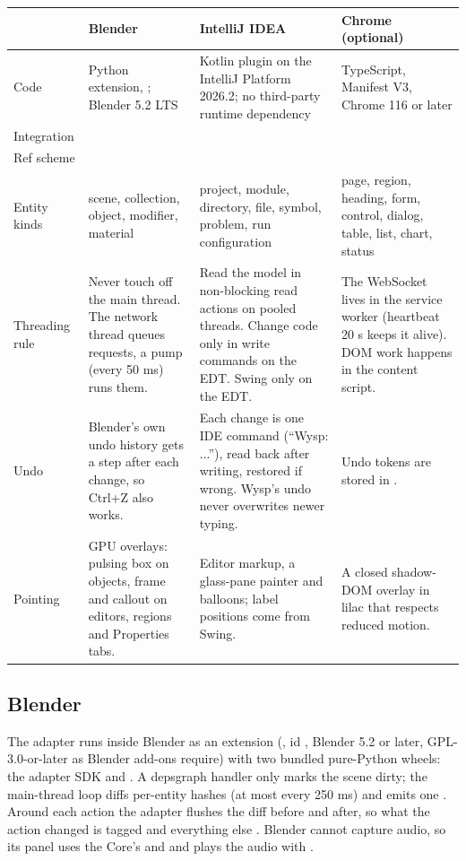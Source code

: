 \begin{xltabular}{\textwidth}{@{}L{2.4cm}Y Y Y@{}}
\toprule
 & \textbf{Blender} & \textbf{IntelliJ IDEA} & \textbf{Chrome (optional)} \\
\midrule
Code & Python extension, ; Blender 5.2 LTS & Kotlin plugin on the IntelliJ Platform 2026.2; no third-party runtime dependency & TypeScript, Manifest V3, Chrome 116 or later \\
Integration &  &  &  \\
Ref scheme &  &  &  \\
Entity kinds & scene, collection, object, modifier, material & project, module, directory, file, symbol, problem, run configuration & page, region, heading, form, control, dialog, table, list, chart, status \\
Threading rule & Never touch  off the main thread. The network thread queues requests, a  pump (every 50 ms) runs them. & Read the model in non-blocking read actions on pooled threads. Change code only in write commands on the EDT. Swing only on the EDT. & The WebSocket lives in the service worker (heartbeat 20 s keeps it alive). DOM work happens in the content script. \\
Undo & Blender's own undo history gets a step after each change, so Ctrl+Z also works. & Each change is one IDE command (``Wysp: ...''), read back after writing, restored if wrong. Wysp's undo never overwrites newer typing. & Undo tokens are stored in . \\
Pointing & GPU overlays: pulsing box on objects, frame and callout on editors, regions and Properties tabs. & Editor markup, a glass-pane painter and balloons; label positions come from Swing. & A closed shadow-DOM overlay in lilac that respects reduced motion. \\
\bottomrule
\end{xltabular}

\subsection{Blender}

The adapter runs inside Blender as an extension (, id , Blender 5.2 or later, GPL-3.0-or-later as Blender add-ons require) with two bundled pure-Python wheels: the adapter SDK and . A depsgraph handler only marks the scene dirty; the main-thread loop diffs per-entity hashes (at most every 250 ms) and emits one . Around each action the adapter flushes the diff before and after, so what the action changed is tagged  and everything else . Blender cannot capture audio, so its panel uses the Core's  and  and plays the audio with .


